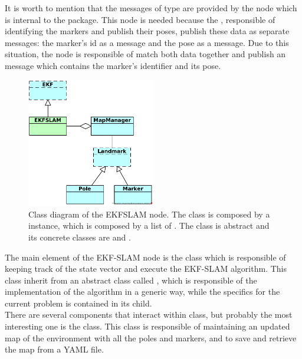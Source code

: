 It is worth to mention that the messages of type  are provided by the  node which is internal to the  package. This node is needed because the , responsible of identifying the markers and publish their poses, publish these data as separate messages: the marker's id as a  message and the pose as a  message. Due to this situation, the  node is responsible of match both data together and publish an  message which contains the marker's identifier and its pose.\\

\begin{figure}
    \centering
    \includegraphics[width=0.5\textwidth]{Images/fig10-class_diagram}
    \caption[Class diagram of the EKFSLAM node]{Class diagram of the EKFSLAM node. The  class is composed by a  instance, which is composed by a list of . The  class is abstract and its concrete classes are  and .}
    \label{fig:chapter2:architecture:class}
\end{figure}

The main element of the EKF-SLAM node is the  class which is responsible of keeping track of the state vector and execute the EKF-SLAM algorithm. This class inherit from an abstract class called , which is responsible of the implementation of the algorithm in a generic way, while the specifics for the current problem is contained in its child.\\

There are several components that interact within  class, but probably the most interesting one is the  class. This class is responsible of maintaining an updated map of the environment with all the poles and markers, and to save and retrieve the map from a YAML file.\\

